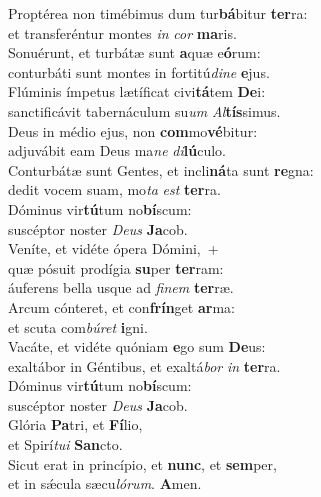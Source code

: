 \evenverse Proptérea non timébimus dum tur\textbf{bá}bitur \textbf{ter}ra:~\*\\
\evenverse et transferéntur montes \textit{in} \textit{cor} \textbf{ma}ris.\\
\oddverse Sonuérunt, et turbátæ sunt \textbf{a}quæ e\textbf{ó}rum:~\*\\
\oddverse conturbáti sunt montes in fortitú\textit{di}\textit{ne} \textbf{e}jus.\\
\evenverse Flúminis ímpetus lætíficat civi\textbf{tá}tem \textbf{De}i:~\*\\
\evenverse sanctificávit tabernáculum su\textit{um} \textit{Al}\textbf{tís}simus.\\
\oddverse Deus in médio ejus, non \textbf{com}mo\textbf{vé}bitur:~\*\\
\oddverse adjuvábit eam Deus ma\textit{ne} \textit{di}\textbf{lú}culo.\\
\evenverse Conturbátæ sunt Gentes, et incli\textbf{ná}ta sunt \textbf{re}gna:~\*\\
\evenverse dedit vocem suam, mo\textit{ta} \textit{est} \textbf{ter}ra.\\
\oddverse Dóminus vir\textbf{tú}tum no\textbf{bí}scum:~\*\\
\oddverse suscéptor noster \textit{De}\textit{us} \textbf{Ja}cob.\\
\evenverse Veníte, et vidéte ópera Dómini,~+\\
\evenverse  quæ pósuit prodígia \textbf{su}per \textbf{ter}ram:~\*\\
\evenverse áuferens bella usque ad \textit{fi}\textit{nem} \textbf{ter}ræ.\\
\oddverse Arcum cónteret, et con\textbf{frín}get \textbf{ar}ma:~\*\\
\oddverse et scuta com\textit{bú}\textit{ret} \textbf{i}gni.\\
\evenverse Vacáte, et vidéte quóniam \textbf{e}go sum \textbf{De}us:~\*\\
\evenverse exaltábor in Géntibus, et exaltá\textit{bor} \textit{in} \textbf{ter}ra.\\
\oddverse Dóminus vir\textbf{tú}tum no\textbf{bí}scum:~\*\\
\oddverse suscéptor noster \textit{De}\textit{us} \textbf{Ja}cob.\\
\evenverse Glória \textbf{Pa}tri, et \textbf{Fí}lio,~\*\\
\evenverse et Spirí\textit{tu}\textit{i} \textbf{San}cto.\\
\oddverse Sicut erat in princípio, et \textbf{nunc}, et \textbf{sem}per,~\*\\
\oddverse et in sǽcula sæcu\textit{ló}\textit{rum}. \textbf{A}men.\\
